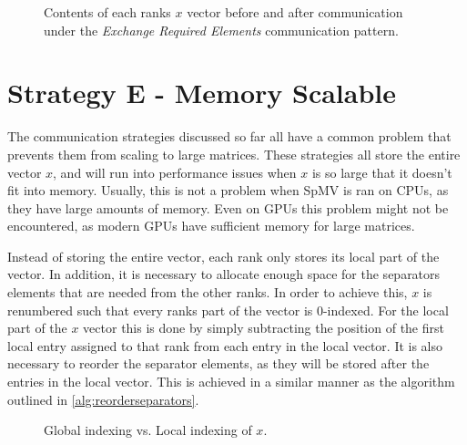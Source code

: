 \begin{figure}[ht]
    \centering
    \caption{Contents of each ranks \(x\) vector before and after communication under the \textit{Exchange Required Elements} communication pattern.}
    \label{fig:1dcomm}
\end{figure}


\section{Strategy E - Memory Scalable}
\label{sec:memscal}
The communication strategies discussed so far all have a common problem that prevents them from scaling to large matrices. These strategies all store the entire vector \(x\), and will run into performance issues when \(x\) is so large that it doesn't fit into memory. Usually, this is not a problem when SpMV is ran on CPUs, as they have large amounts of memory. Even on GPUs this problem might not be encountered, as modern GPUs have sufficient memory for large matrices.
\medskip


Instead of storing the entire vector, each rank only stores its local part of the vector. In addition, it is necessary to allocate enough space for the separators elements that are needed from the other ranks. In order to achieve this, \(x\) is renumbered such that every ranks part of the vector is 0-indexed. For the local part of the \(x\) vector this is done by simply subtracting the position of the first local entry assigned to that rank from each entry in the local vector. It is also necessary to reorder the separator elements, as they will be stored after the entries in the local vector. This is achieved in a similar manner as the algorithm outlined in \ref{alg:reorderseparators}.

\medskip



\begin{figure}[ht]
    \centering
    \caption{Global indexing vs. Local indexing of \(x\).}
    \label{fig:2dcomm}
\end{figure}








